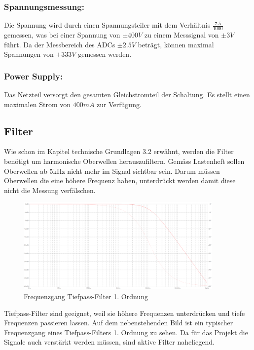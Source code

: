 \subsubsection*{Spannungsmessung:}
Die Spannung wird durch einen Spannungsteiler mit dem Verhältnis $\frac{7.5}{1000}$ gemessen, was bei einer Spannung von $\pm 400V$ zu einem Messsignal von $\pm 3V$ führt. Da der Messbereich des ADCs $\pm 2.5V$ beträgt, können maximal Spannungen von $\pm 333V$ gemessen werden.

\subsubsection*{Power Supply:}
Das Netzteil versorgt den gesamten Gleichstromteil der Schaltung. Es stellt einen maximalen Strom von $400mA$ zur Verfügung.

\subsection{Filter}

Wie schon im Kapitel technische Grundlagen 3.2 erwähnt, werden die Filter benötigt um harmonische Oberwellen herauszufiltern. Gemäss Lastenheft sollen Oberwellen ab 5kHz nicht mehr im Signal sichtbar sein. Darum müssen Oberwellen die eine höhere Frequenz haben, unterdrückt werden damit diese nicht die Messung verfälschen.

\begin{figure}[H]
\begin{center}
\includegraphics[width=0.9\textwidth]{images/Analoge_Schaltung_Frequenzgang.png}
\caption{Frequenzgang Tiefpass-Filter 1. Ordnung}
\end{center}
\end{figure}


Tiefpass-Filter sind geeignet, weil sie höhere Frequenzen unterdrücken und tiefe Frequenzen passieren lassen. Auf dem nebenstehenden Bild ist ein typischer Frequenzgang eines Tiefpass-Filters 1. Ordnung zu sehen. Da für das Projekt die Signale auch verstärkt werden müssen, sind aktive Filter naheliegend.\cite{ant}



